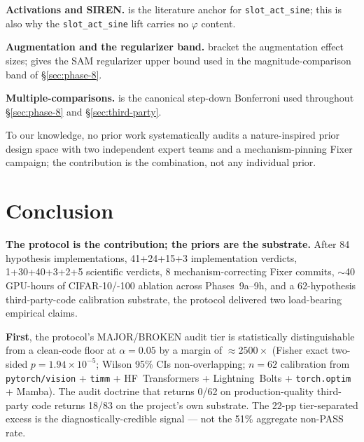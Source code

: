 \documentclass{article}
\begin{document}
\textbf{Activations and SIREN.} \citet{sitzmann2020siren} is the
literature anchor for \texttt{slot\_act\_sine}; this is also why the
\texttt{slot\_act\_sine} lift carries no $\varphi$ content.

\textbf{Augmentation and the regularizer band.}
\citet{cubuk2020randaugment, zhang2018mixup} bracket the augmentation
effect sizes; \citet{foret2021sam} gives the SAM regularizer upper
bound used in the magnitude-comparison band of \S\ref{sec:phase-8}.

\textbf{Multiple-comparisons.} \citet{holm1979} is the canonical
step-down Bonferroni used throughout \S\ref{sec:phase-8} and
\S\ref{sec:third-party}.

To our knowledge, no prior work systematically audits a
nature-inspired prior design space with two independent expert teams
and a mechanism-pinning Fixer campaign; the contribution is the
combination, not any individual prior.

\section{Conclusion}
\label{sec:conclusion}

\textbf{The protocol is the contribution; the priors are the
substrate.} After 84 hypothesis implementations, 41+24+15+3
implementation verdicts, 1+30+40+3+2+5 scientific verdicts, 8
mechanism-correcting Fixer commits, $\sim$40 GPU-hours of
CIFAR-10/-100 ablation across Phases~9a--9h, and a 62-hypothesis
third-party-code calibration substrate, the protocol delivered two
load-bearing empirical claims.

\textbf{First}, the protocol's MAJOR/BROKEN audit tier is
statistically distinguishable from a clean-code floor at
$\alpha{=}0.05$ by a margin of $\approx 2500\times$ (Fisher exact
two-sided $p = 1.94 \times 10^{-5}$; Wilson 95\% CIs non-overlapping;
$n{=}62$ calibration from \texttt{pytorch/vision} + \texttt{timm} +
HF~Transformers + Lightning~Bolts + \texttt{torch.optim} + Mamba). The
audit doctrine that returns 0/62 on production-quality third-party
code returns 18/83 on the project's own substrate. The 22-pp
tier-separated excess is the diagnostically-credible signal --- not
the 51\% aggregate non-PASS rate.
\end{document}
